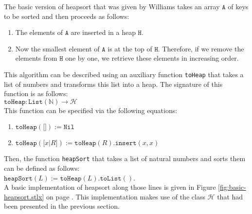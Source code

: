 The basic version of heapsort that was given by Williams takes an array $\texttt{A}$ of keys to be sorted and
then proceeds as follows:
\begin{enumerate}
\item The elements of $\texttt{A}$ are inserted in a heap $\texttt{H}$.
\item Now the smallest element of $\texttt{A}$ is at the top of $\texttt{H}$.  Therefore, if we remove the elements
      from $\texttt{H}$ one by one, we retrieve these elements in increasing order.
\end{enumerate}
This algorithm can be described using an auxiliary function \texttt{toHeap} that takes a list of numbers and
transforms this list into a heap.  The signature of this function is as follows:
\\[0.2cm]
\hspace*{1.3cm}
$\texttt{toHeap}: \texttt{List}(\mathbb{N}) \rightarrow \mathcal{H}$
\\[0.2cm]
This function can be specified via the following equations:
\begin{enumerate}
\item $\texttt{toHeap}(\texttt{[]}) := \texttt{Nil}$
\item $\texttt{toHeap}(\texttt{[}x\texttt{|}R\texttt{]}) := \texttt{toHeap}(R).\texttt{insert}(x, x)$
\end{enumerate}
Then, the function \texttt{heapSort} that takes a list of natural numbers and sorts them can be defined as follows:
\\[0.2cm]
\hspace*{1.3cm}
$\texttt{heapSort}(L) := \texttt{toHeap}(L).\texttt{toList}()$.
\\[0.2cm]
A basic implementation of heapsort along those lines is given in Figure
\ref{fig:basic-heapsort.stlx} on page \pageref{fig:basic-heapsort.stlx}.  This implementation makes
use of the class $\mathcal{H}$ that had been presented in the previous section.
